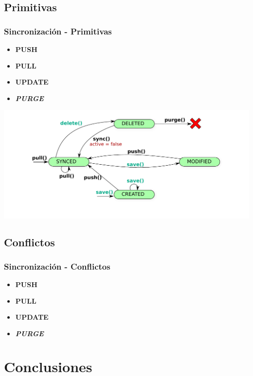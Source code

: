 \documentclass{beamer}
\begin{document}
\subsection{Primitivas}
\begin{frame}
    \frametitle{Sincronización - Primitivas}
    

        \begin{itemize}
            \item {\bf PUSH}
            \item {\bf PULL}
            \item {\bf UPDATE}
            \item \textit{\bf PURGE}
        \end{itemize}
        \vfill
        \includegraphics[scale=0.43]{esquema_sync_client.pdf}
        \vfill
    
\end{frame}

\subsection{Conflictos}
\begin{frame}
    \frametitle{Sincronización - Conflictos}
    \begin{itemize}
        \item {\bf PUSH}
        \item {\bf PULL}
        \item {\bf UPDATE}
        \item \textit{\bf PURGE}
    \end{itemize}
\end{frame}

\section{Conclusiones}
\end{document}
